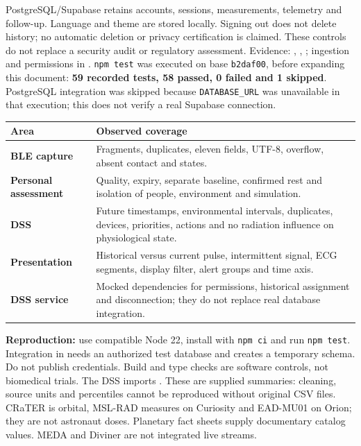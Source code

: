 PostgreSQL/Supabase retains accounts, sessions, measurements, telemetry and follow-up. Language and theme are stored locally. Signing out does not delete history; no automatic deletion or privacy certification is claimed. These controls do not replace a security audit or regulatory assessment.
\vfill
{\footnotesize\color{muted}Evidence: , , ; ingestion and permissions in .}
\newpage
{}
\texttt{npm test} was executed on base \texttt{b2daf00}, before expanding this document: \textbf{59 recorded tests, 58 passed, 0 failed and 1 skipped}. PostgreSQL integration was skipped because \texttt{DATABASE\_URL} was unavailable in that execution; this does not verify a real Supabase connection.
\par\noindent\begin{tabularx}{\linewidth}{@{}>{\bfseries}p{35mm}X@{}}
\toprule Area & Observed coverage\\\midrule
BLE capture & Fragments, duplicates, eleven fields, UTF-8, overflow, absent contact and states.\\[6pt]
Personal assessment & Quality, expiry, separate baseline, confirmed rest and isolation of people, environment and simulation.\\[6pt]
DSS & Future timestamps, environmental intervals, duplicates, devices, priorities, actions and no radiation influence on physiological state.\\[6pt]
Presentation & Historical versus current pulse, intermittent signal, ECG segments, display filter, alert groups and time axis.\\[6pt]
DSS service & Mocked dependencies for permissions, historical assignment and disconnection; they do not replace real database integration.\\\bottomrule
\end{tabularx}\par
\textbf{Reproduction:} use compatible Node 22, install with \texttt{npm ci} and run \texttt{npm test}. Integration in  needs an authorized test database and creates a temporary schema. Do not publish credentials. Build and type checks are software controls, not biomedical trials.
The DSS imports . These are supplied summaries: cleaning, source units and percentiles cannot be reproduced without original CSV files. CRaTER is orbital, MSL-RAD measures on Curiosity and EAD-MU01 on Orion; they are not astronaut doses. Planetary fact sheets supply documentary catalog values. MEDA and Diviner are not integrated live streams.
